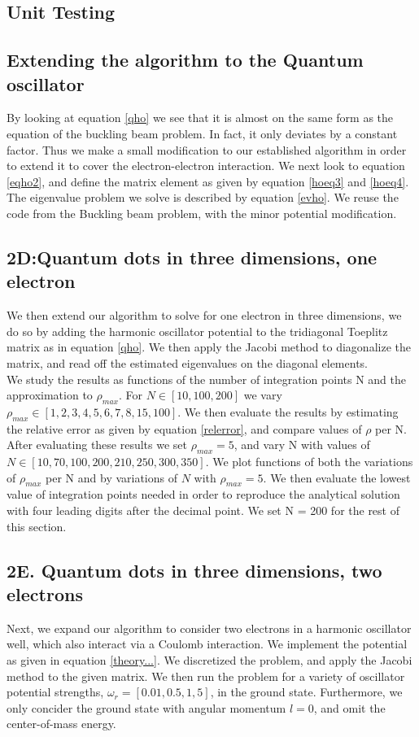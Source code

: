 \documentclass[%
reprint,
amsmath,amssymb,
aps,
]{revtex4-1}
\begin{document}
\subsection{Unit Testing}

\subsection{Extending the algorithm to the Quantum oscillator} \noindent 
By looking at equation \ref{qho} we see that it is almost on the same form as the equation of the buckling beam problem. In fact, it only deviates by a constant factor. Thus we make a small modification to our established algorithm in order to extend it to cover the electron-electron interaction. We next look to equation \ref{eqho2}, and define the matrix element as given by equation \ref{hoeq3} and \ref{hoeq4}. The eigenvalue problem we solve is described by equation \ref{evho}. We reuse the code from the Buckling beam problem, with the minor potential modification.

\subsection{2D:Quantum dots in three dimensions, one electron} \noindent 
We then extend our algorithm to solve for one electron in three dimensions, we do so by adding the harmonic oscillator potential to the tridiagonal Toeplitz matrix as in equation \ref{qho}. We then apply the Jacobi method to diagonalize the matrix, and read off the estimated eigenvalues on the diagonal elements. \\ \indent We study the results as functions of the number of integration points N and the approximation to $\rho_{max}$. For $N\in[10,100,200]$ we vary $\rho_{max} \in [1, 2, 3, 4, 5, 6, 7, 8, 15, 100]$. We then evaluate the results by estimating the relative error as given by equation \ref{relerror}, and compare values of $\rho$ per N. After evaluating these results we set $\rho_{max} = 5$, and vary N with values of $N\in[10, 70, 100, 200, 210, 250, 300, 350]$. We plot functions of both the variations of $\rho_{max}$ per N and by variations of $N$ with $\rho_{max} = 5$. We then evaluate the lowest value of integration points needed in order to reproduce the analytical solution with four leading digits after the decimal point. We set N = 200 for the rest of this section. 

\subsection{2E. Quantum dots in three dimensions, two electrons}
Next, we expand our algorithm to consider two electrons in a harmonic oscillator well, which also interact via a Coulomb interaction. We implement the potential as given in equation \ref{theory...}. We discretized the problem, and apply the Jacobi method to the given matrix. We then run the problem for a variety of oscillator potential strengths, $\omega_r = [0.01,0.5,1,5]$, in the ground state. Furthermore, we only concider the ground state with angular momentum $l = 0$, and omit the center-of-mass energy. 
\end{document}
